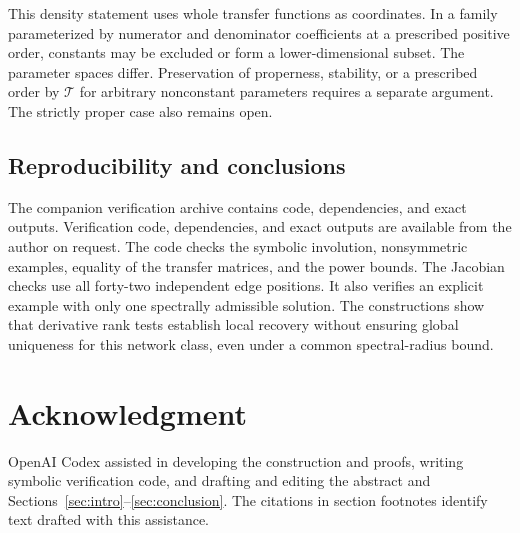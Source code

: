\documentclass[letterpaper,10pt,conference]{ieeeconf}
\begin{document}
This density statement uses whole transfer functions as coordinates.
In a family parameterized by numerator and denominator coefficients
at a prescribed positive order, constants may be excluded or form
a lower-dimensional subset. The parameter spaces differ.
Preservation of properness, stability, or a prescribed order by
\(\mathcal T\) for arbitrary nonconstant parameters requires a
separate argument. The strictly proper case also remains open.

\subsection{Reproducibility and conclusions}

\ifdefined\verificationdoi
The companion verification archive \cite{verification} contains
code, dependencies, and exact outputs.
\else
Verification code, dependencies, and exact outputs are available
from the author on request.
\fi
The code checks the symbolic involution, nonsymmetric examples, equality
of the transfer matrices, and the power bounds. The Jacobian checks
use all forty-two independent edge positions. It also verifies an
explicit example with only one spectrally admissible solution.
The constructions show that derivative rank tests establish local
recovery without ensuring global uniqueness for this network class,
even under a common spectral-radius bound.

\section*{Acknowledgment}
OpenAI Codex \cite{codex} assisted in developing the construction and
proofs, writing symbolic verification code, and drafting and editing
the abstract and Sections~\ref{sec:intro}--\ref{sec:conclusion}.
The citations in section footnotes identify text drafted with this
assistance.
\end{document}
